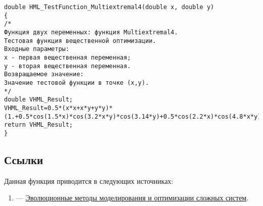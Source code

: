 \begin{lstlisting}[caption=Код функции HML\_TestFunction\_Multiextremal4]
double HML_TestFunction_Multiextremal4(double x, double y)
{
/*
Функция двух переменных: функция Multiextremal4.
Тестовая функция вещественной оптимизации.
Входные параметры:
x - первая вещественная переменная;
y - вторая вещественная переменная.
Возвращаемое значение:
Значение тестовой функции в точке (x,y).
*/
double VHML_Result;
VHML_Result=0.5*(x*x+x*y+y*y)*(1.+0.5*cos(1.5*x)*cos(3.2*x*y)*cos(3.14*y)+0.5*cos(2.2*x)*cos(4.8*x*y)*cos(3.5*y));
return VHML_Result;
}
\end{lstlisting}

\subsection {Ссылки}

Данная функция приводится в следующих источниках:

\begin{enumerate}
	\item \cite[стр. 31]{book:Semenkin2007} ---  \href{http://files.lib.sfu-kras.ru/ebibl/umkd/22/u_lectures.pdf}{Эволюционные методы моделирования и оптимизации сложных систем}.
\end{enumerate}